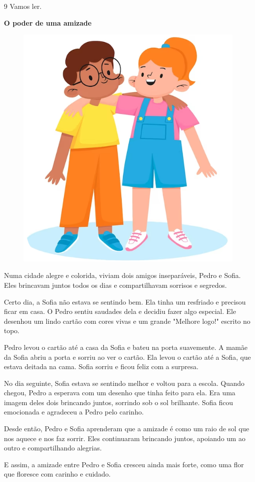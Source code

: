 \num{9} Vamos ler.

\begin{myquote}
\textbf{O poder de uma amizade}

\begin{figure}[H]
\centering
\includegraphics[width=.6\textwidth]{media/image199.png}
\end{figure}

Numa cidade alegre e colorida, viviam dois amigos inseparáveis, Pedro e Sofia. Eles brincavam juntos todos os dias e compartilhavam sorrisos e segredos.

Certo dia, a Sofia não estava se sentindo bem. Ela tinha um resfriado e precisou ficar em casa. O Pedro sentiu saudades dela e decidiu fazer algo especial. Ele desenhou um lindo cartão com cores vivas e um grande "Melhore logo!" escrito no topo.

Pedro levou o cartão até a casa da Sofia e bateu na porta suavemente. A mamãe da Sofia abriu a porta e sorriu ao ver o cartão. Ela levou o cartão até a Sofia, que estava deitada na cama. Sofia sorriu e ficou feliz com a surpresa.

No dia seguinte, Sofia estava se sentindo melhor e voltou para a escola. Quando chegou, Pedro a esperava com um desenho que tinha feito para ela. Era uma imagem deles dois brincando juntos, sorrindo sob o sol brilhante. Sofia ficou emocionada e agradeceu a Pedro pelo carinho.

Desde então, Pedro e Sofia aprenderam que a amizade é como um raio de sol que nos aquece e nos faz sorrir. Eles continuaram brincando juntos, apoiando um ao outro e compartilhando alegrias.

E assim, a amizade entre Pedro e Sofia cresceu ainda mais forte, como uma flor que floresce com carinho e cuidado.
\end{myquote}

